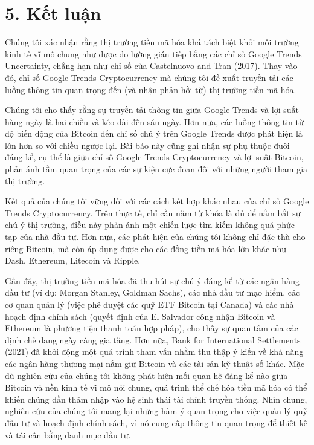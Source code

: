 \section{5. Kết luận}

Chúng tôi xác nhận rằng thị trường tiền mã hóa khá tách biệt khỏi môi trường kinh tế vĩ mô chung như được đo lường gián tiếp bằng các chỉ số Google Trends Uncertainty, chẳng hạn như chỉ số của Castelnuovo and Tran (2017). Thay vào đó, chỉ số Google Trends Cryptocurrency mà chúng tôi đề xuất truyền tải các luồng thông tin quan trọng đến (và nhận phản hồi từ) thị trường tiền mã hóa.

Chúng tôi cho thấy rằng sự truyền tải thông tin giữa Google Trends và lợi suất hàng ngày là hai chiều và kéo dài đến sáu ngày. Hơn nữa, các luồng thông tin từ độ biến động của Bitcoin đến chỉ số chú ý trên Google Trends được phát hiện là lớn hơn so với chiều ngược lại. Bài báo này cũng ghi nhận sự phụ thuộc đuôi đáng kể, cụ thể là giữa chỉ số Google Trends Cryptocurrency và lợi suất Bitcoin, phản ánh tầm quan trọng của các sự kiện cực đoan đối với những người tham gia thị trường.

Kết quả của chúng tôi vững đối với các cách kết hợp khác nhau của chỉ số Google Trends Cryptocurrency. Trên thực tế, chỉ cần năm từ khóa là đủ để nắm bắt sự chú ý thị trường, điều này phản ánh một chiến lược tìm kiếm không quá phức tạp của nhà đầu tư. Hơn nữa, các phát hiện của chúng tôi không chỉ đặc thù cho riêng Bitcoin, mà còn áp dụng được cho các đồng tiền mã hóa lớn khác như Dash, Ethereum, Litecoin và Ripple.

Gần đây, thị trường tiền mã hóa đã thu hút sự chú ý đáng kể từ các ngân hàng đầu tư (ví dụ: Morgan Stanley, Goldman Sachs), các nhà đầu tư mạo hiểm, các cơ quan quản lý (việc phê duyệt các quỹ ETF Bitcoin tại Canada) và các nhà hoạch định chính sách (quyết định của El Salvador công nhận Bitcoin và Ethereum là phương tiện thanh toán hợp pháp), cho thấy sự quan tâm của các định chế đang ngày càng gia tăng. Hơn nữa, Bank for International Settlements (2021) đã khởi động một quá trình tham vấn nhằm thu thập ý kiến về khả năng các ngân hàng thương mại nắm giữ Bitcoin và các tài sản kỹ thuật số khác. Mặc dù nghiên cứu của chúng tôi không phát hiện mối quan hệ đáng kể nào giữa Bitcoin và nền kinh tế vĩ mô nói chung, quá trình thể chế hóa tiền mã hóa có thể khiến chúng dần thâm nhập vào hệ sinh thái tài chính truyền thống. Nhìn chung, nghiên cứu của chúng tôi mang lại những hàm ý quan trọng cho việc quản lý quỹ đầu tư và hoạch định chính sách, vì nó cung cấp thông tin quan trọng để thiết kế và tái cân bằng danh mục đầu tư.

